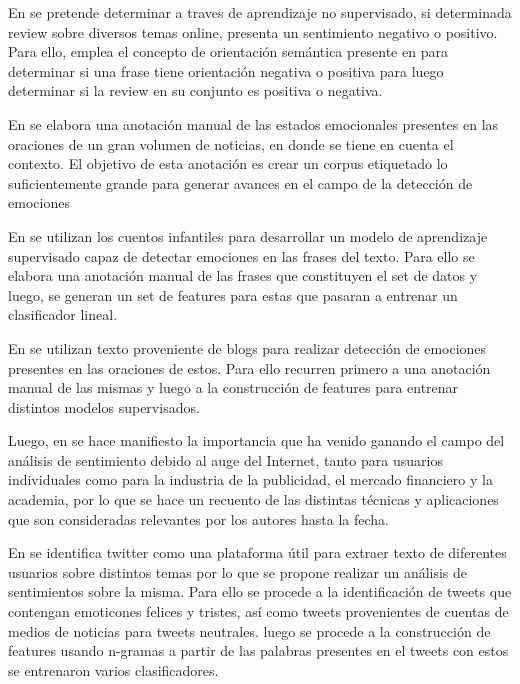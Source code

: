 En \cite{turney2002thumbs} se pretende determinar a traves de aprendizaje no supervisado, si determinada review sobre diversos temas online, presenta un sentimiento negativo o positivo. Para ello, emplea el concepto de orientación semántica presente en \cite{hatzivassiloglou1997predicting} para determinar si una frase tiene orientación negativa o positiva para luego determinar si la review en su conjunto es positiva o negativa.

En \cite{wiebe2005annotating} se elabora una anotación manual de las estados emocionales presentes en las oraciones de un gran volumen de noticias, en donde se tiene en cuenta el contexto. El objetivo de esta anotación es crear un corpus etiquetado lo suficientemente grande para generar avances en el campo de la detección de emociones

En \cite{alm2005emotions} se utilizan los cuentos infantiles para desarrollar un modelo de aprendizaje supervisado capaz de detectar emociones en las frases del texto. Para ello se elabora una anotación manual de las frases que constituyen el set de datos y luego, se generan un set de features para estas que pasaran a entrenar un clasificador lineal.

En \cite{aman2007identifying} se utilizan texto proveniente de blogs para realizar detección de emociones presentes en las oraciones de estos. Para ello recurren primero a una anotación manual de las mismas y luego a la construcción de features para entrenar distintos modelos supervisados.


Luego, en \cite{pang2008opinion} se hace manifiesto la importancia que ha venido ganando el campo del análisis de sentimiento debido al auge del Internet, tanto para usuarios individuales como para la industria de la publicidad, el mercado financiero y la academia, por lo que se hace un recuento de las distintas técnicas y aplicaciones que son consideradas relevantes por los autores hasta la fecha. 




En \cite{pak2010twitter} se identifica twitter como una plataforma útil para extraer texto de diferentes usuarios sobre distintos temas por lo que se propone realizar un análisis de sentimientos sobre la misma. Para ello se procede  a la identificación de tweets que contengan emoticones felices y tristes, así como tweets provenientes de cuentas de medios de noticias para tweets neutrales. luego se procede a la construcción de features usando n-gramas a partir de las palabras presentes en el tweets  con estos se entrenaron varios clasificadores.



